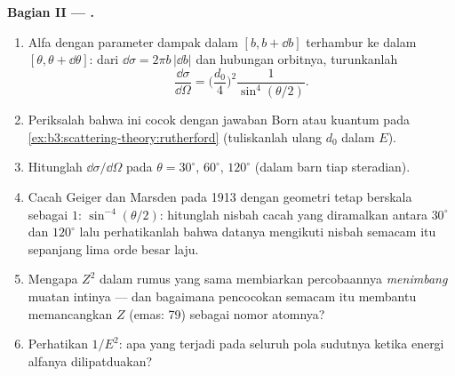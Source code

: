\begin{problem}
\medskip\noindent\textbf{Bagian II --- .}
\begin{enumerate}[resume]
  \item Alfa dengan parameter dampak dalam $[b, b + \dd b]$ terhambur
        ke dalam $[\theta, \theta + \dd\theta]$: dari $\dd\sigma =
        2\pi b\,|\dd b|$ dan hubungan orbitnya, turunkanlah
        \[
        \frac{\dd\sigma}{\dd\Omega} =
        \Big(\frac{d_0}{4}\Big)^2\frac{1}{\sin^4(\theta/2)} .
        \]
  \item Periksalah bahwa ini cocok dengan jawaban Born atau kuantum pada
        \cref{ex:b3:scattering-theory:rutherford} (tuliskanlah ulang
        $d_0$ dalam $E$).
  \item Hitunglah $\dd\sigma/\dd\Omega$ pada $\theta = 30^\circ$,
        $60^\circ$, $120^\circ$ (dalam barn tiap steradian).
  \item Cacah Geiger dan Marsden pada 1913 dengan geometri tetap
        berskala sebagai $1{:}\,\sin^{-4}(\theta/2)$: hitunglah nisbah
        cacah yang diramalkan antara $30^\circ$ dan $120^\circ$ lalu
        perhatikanlah bahwa datanya mengikuti nisbah semacam itu
        sepanjang lima orde besar laju.
  \item Mengapa $Z^2$ dalam rumus yang sama membiarkan percobaannya
        \emph{menimbang} muatan intinya --- dan bagaimana pencocokan
        semacam itu membantu memancangkan $Z$ (emas: 79) sebagai nomor
        atomnya?
  \item Perhatikan $1/E^2$: apa yang terjadi pada seluruh pola sudutnya
        ketika energi alfanya dilipatduakan?
\end{enumerate}


\end{problem}
